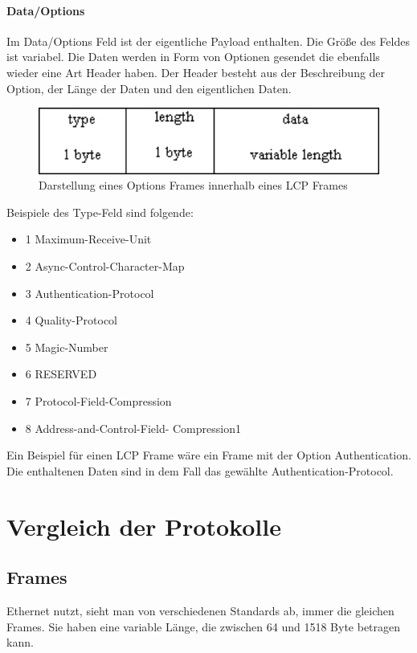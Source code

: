 \documentclass[12pt, a4paper, ngerman]{article}
\begin{document}
\paragraph{Data/Options}
Im Data/Options Feld ist der eigentliche Payload enthalten. Die Größe des Feldes ist variabel. Die Daten werden in Form von Optionen gesendet die ebenfalls wieder eine Art Header haben. Der Header besteht aus der Beschreibung der Option, der Länge der Daten und den eigentlichen Daten.

\begin{figure}[H]
	\centering
	\includegraphics[width=1\textwidth]{Grafiken/lcp-option-header.jpg}	
	\caption{Darstellung eines Options Frames innerhalb eines LCP Frames}
\end{figure}

Beispiele des Type-Feld sind folgende:

\begin{itemize}
	\item 1 Maximum-Receive-Unit
	\item 2 Async-Control-Character-Map
	\item 3 Authentication-Protocol
	\item 4 Quality-Protocol
	\item 5 Magic-Number
	\item 6 RESERVED
	\item 7 Protocol-Field-Compression
	\item 8 Address-and-Control-Field- Compression1
\end{itemize} 

Ein Beispiel für einen LCP Frame wäre ein Frame mit der Option Authentication. Die enthaltenen Daten sind in dem Fall das gewählte  Authen\-ti\-ca\-tion-Protocol.

\section{Vergleich der Protokolle}
\subsection{Frames}
Ethernet nutzt, sieht man von verschiedenen Standards ab, immer die gleichen Frames. Sie haben eine variable Länge, die zwischen 64 und 1518 Byte betragen kann.
\end{document}
